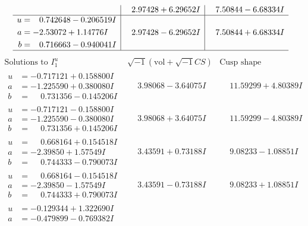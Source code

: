 \documentclass[1p]{elsarticle_modified}
\theoremstyle{definition}
\newcommand{\I}{\sqrt{-1}}
\begin{document}
$$\begin{array}{c|c|c}
 & \phantom{-}2.97428 + 6.29652 I & \phantom{-}7.50844 - 6.68334 I \\ \hline\begin{aligned}
u &= \phantom{-}0.742648 - 0.206519 I \\
a &= -2.53072 + 1.14776 I \\
b &= \phantom{-}0.716663 - 0.940041 I\end{aligned}
 & \phantom{-}2.97428 - 6.29652 I & \phantom{-}7.50844 + 6.68334 I\\
 \hline 
 \end{array}$$\newpage$$\begin{array}{c|c|c}  
\text{Solutions to }I^u_{1}& \I (\text{vol} + \sqrt{-1}CS) & \text{Cusp shape}\\
 \hline 
\begin{aligned}
u &= -0.717121 + 0.158800 I \\
a &= -1.225590 + 0.380080 I \\
b &= \phantom{-}0.731356 - 0.145206 I\end{aligned}
 & \phantom{-}3.98068 - 3.64075 I & \phantom{-}11.59299 + 4.80389 I \\ \hline\begin{aligned}
u &= -0.717121 - 0.158800 I \\
a &= -1.225590 - 0.380080 I \\
b &= \phantom{-}0.731356 + 0.145206 I\end{aligned}
 & \phantom{-}3.98068 + 3.64075 I & \phantom{-}11.59299 - 4.80389 I \\ \hline\begin{aligned}
u &= \phantom{-}0.668164 + 0.154518 I \\
a &= -2.39850 + 1.57549 I \\
b &= \phantom{-}0.744333 - 0.790073 I\end{aligned}
 & \phantom{-}3.43591 + 0.73188 I & \phantom{-}9.08233 - 1.08851 I \\ \hline\begin{aligned}
u &= \phantom{-}0.668164 - 0.154518 I \\
a &= -2.39850 - 1.57549 I \\
b &= \phantom{-}0.744333 + 0.790073 I\end{aligned}
 & \phantom{-}3.43591 - 0.73188 I & \phantom{-}9.08233 + 1.08851 I \\ \hline\begin{aligned}
u &= -0.129344 + 1.322690 I \\
a &= -0.479899 - 0.769382 I \\

\end{aligned}
\end{array}$$
\end{document}
